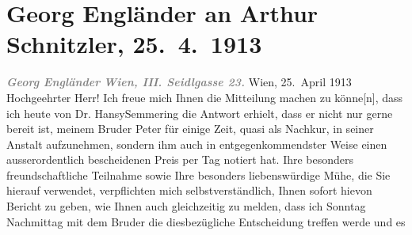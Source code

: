 

         
         \renewcommand{\erwaehntePersonen}{Personen: Peter Altenberg, Georg Engländer, Margarethe Engländer, Franz Hansy}
         \renewcommand{\erwaehnteOrte}{Orte: Seidlgasse, Semmering, Wien}
         \renewcommand{\erwaehnteWerke}{}
               \section[Georg Engländer an Arthur Schnitzler, 25. 4. 1913]{ Georg Engländer an Arthur Schnitzler, 25. 4. 1913}\nopagebreak{}\rehead{ }\begin{ledgroupsized}[t]{13cm}\normalsize\beginnumbering \toendnotes[C]{\smallbreak\pagebreak[2]} 
\toendnotes[C]{\smallbreak}\pstart
           \noindent{}{\pb}\textcolor{gray}{\textbf{\textit{Georg Engländer}}}\pend
           \pstart
           \textcolor{gray}{\textbf{\textit{Wien, III. Seidlgasse 23.}}}\pend
           \pstart
           \raggedleft{}Wien, 25. April 1913\pend
           \pstart{}Hochgeehrter Herr!\pend\pstart
           Ich freue mich Ihnen die Mitteilung machen zu könne{[}n{]}, dass ich
               heute von Dr. HansySemmering die Antwort erhielt, dass er nicht nur
               gerne bereit ist, meinem Bruder Peter für
               einige Zeit, quasi als Nachkur, in seiner Anstalt aufzunehmen, sondern ihm auch in
               entgegenkommendster Weise einen ausserordentlich bescheidenen Preis per Tag notiert
               hat.\pend
           \pstart
           Ihre besonders freundschaftliche Teilnahme sowie Ihre besonders liebenswürdige Mühe,
               die Sie hierauf verwendet, verpflichten mich selbstverständlich, Ihnen sofort hievon
               Bericht zu geben, wie Ihnen auch gleichzeitig zu melden, dass ich
                  Sonntag{ }{\pb}Nachmittag mit dem Bruder die diesbezügliche Entscheidung treffen werde und es

\end{ledgroupsized}
